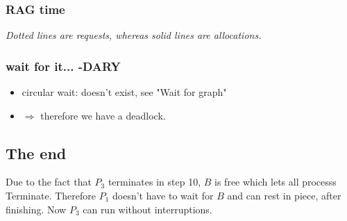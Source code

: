 \documentclass[a4paper, 11pt]{article}
\begin{document}
      \subsubsection{RAG time}
      \begin{figure}[h!]
            \centering
      \end{figure}
      \begin{center}
            \textit{Dotted lines are requests, whereas solid lines are allocations.}
      \end{center}
      \subsubsection{wait for it... -DARY}
      \begin{multicols}{3}
            \begin{itemize}
                \item circular wait: doesn't exist, see "Wait for graph"
                \item[] $\Rightarrow$ therefore we have a deadlock.
            \end{itemize}
      \end{multicols}

      \subsection{The end}
      Due to the fact that $P_3$ terminates in step 10, $B$ is free which lets all processs Terminate. Therefore $P_1$ doesn't have to wait for $B$ and can rest in piece, after finishing. Now $P_3$ can run without interruptions.   
\end{document}
